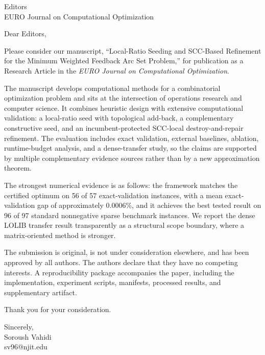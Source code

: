 \documentclass[12pt]{letter}
\begin{document}
\begin{letter}{Editors\\EURO Journal on Computational Optimization}

\opening{Dear Editors,}

Please consider our manuscript, ``Local-Ratio Seeding and SCC-Based Refinement for the Minimum Weighted Feedback Arc Set Problem,'' for publication as a Research Article in the \textit{EURO Journal on Computational Optimization}.

The manuscript develops computational methods for a combinatorial optimization problem and sits at the intersection of operations research and computer science. It combines heuristic design with extensive computational validation: a local-ratio seed with topological add-back, a complementary constructive seed, and an incumbent-protected SCC-local destroy-and-repair refinement. The evaluation includes exact validation, external baselines, ablation, runtime-budget analysis, and a dense-transfer study, so the claims are supported by multiple complementary evidence sources rather than by a new approximation theorem.

The strongest numerical evidence is as follows: the framework matches the certified optimum on 56 of 57 exact-validation instances, with a mean exact-validation gap of approximately 0.0006\%, and it achieves the best tested result on 96 of 97 standard nonnegative sparse benchmark instances. We report the dense LOLIB transfer result transparently as a structural scope boundary, where a matrix-oriented method is stronger.

The submission is original, is not under consideration elsewhere, and has been approved by all authors. The authors declare that they have no competing interests. A reproducibility package accompanies the paper, including the implementation, experiment scripts, manifests, processed results, and supplementary artifact.

Thank you for your consideration.

\closing{Sincerely,\\[1.5ex]Soroush Vahidi\\\mbox{sv96@njit.edu}}

\end{letter}
\end{document}
